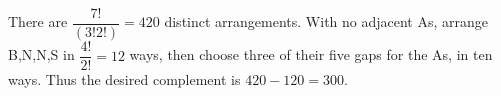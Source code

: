There are $\dfrac{7!}{(3!2!)}=420$ distinct arrangements. With no adjacent As, arrange B,N,N,S in $\dfrac{4!}{2!}=12$ ways, then choose three of their five gaps for the As, in ten ways. Thus the desired complement is $420-120=\boxed{300}$.
